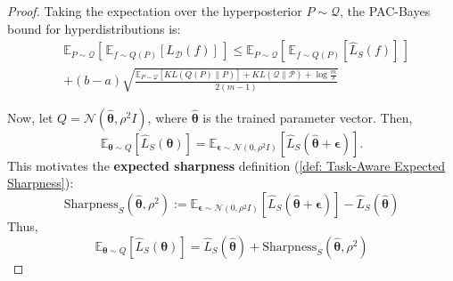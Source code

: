\documentclass[letterpaper]{article} %
\begin{document}
\begin{proof}
Taking the expectation over the hyperposterior $P \sim \mathcal{Q}$, the PAC-Bayes bound for hyperdistributions is:
\begin{equation}
\begin{aligned}
        &\mathbb{E}_{P \sim \mathcal{Q}}\left[\, \mathbb{E}_{f \sim Q(P)} [L_{\mathcal{D}}(f)] \,\right] 
        \leq \mathbb{E}_{P \sim \mathcal{Q}}\left[\, \mathbb{E}_{f \sim Q(P)} [\hat{L}_{S}(f)] \,\right]  \\
        & + (b-a)\sqrt{ \frac{ \mathbb{E}_{P \sim \mathcal{Q}}\left[ KL(Q(P) \| P) \right] + KL(\mathcal{Q} \| \mathcal{P}) + \log \frac{m}{\delta} }{2(m-1)} }
\end{aligned}
\end{equation}



Now, let $Q = \mathcal{N}(\hat{\boldsymbol{\theta}}, \rho^2 I)$, where $\hat{\boldsymbol{\theta}}$ is the trained parameter vector. Then,
$$\mathbb{E}_{\boldsymbol{\theta} \sim Q}[\hat{L}_S(\boldsymbol{\theta})] = \mathbb{E}_{\boldsymbol{\epsilon} \sim \mathcal{N}(0, \rho^2 I)}[\hat{L}_S(\hat{\boldsymbol{\theta}} + \boldsymbol{\epsilon})].$$
This motivates the \textbf{expected sharpness} definition (\ref{def: Task-Aware Expected Sharpness}):
$$\mathrm{Sharpness}_S(\hat{\boldsymbol{\theta}}, \rho^2) := \mathbb{E}_{\boldsymbol{\epsilon} \sim \mathcal{N}(0, \rho^2 I)}\left[ \hat{L}_S(\hat{\boldsymbol{\theta}} + \boldsymbol{\epsilon}) \right] - \hat{L}_S(\hat{\boldsymbol{\theta}})$$
Thus,
$$\mathbb{E}_{\boldsymbol{\theta} \sim Q}[\hat{L}_S(\boldsymbol{\theta})] = \hat{L}_S(\hat{\boldsymbol{\theta}}) + \mathrm{Sharpness}_S(\hat{\boldsymbol{\theta}}, \rho^2)$$





\end{proof}
\end{document}
